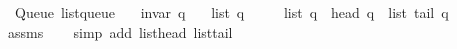 \begin{isabellebody}
%
\endisadeliminvisible
%
\isataginvisible
{}\isamarkupfalse%
\ {\isacharparenleft}{\kern0pt}\ Queue{\isacharparenright}{\kern0pt}\ list{\isacharunderscore}{\kern0pt}queue{\isacharcolon}{\kern0pt}\isanewline
\ \ \ {\isachardoublequoteopen}invar\ q{\isachardoublequoteclose}\isanewline
\ \ \ {\isachardoublequoteopen}list\ q\ {\isasymnoteq}\ {\isacharbrackleft}{\kern0pt}{\isacharbrackright}{\kern0pt}{\isachardoublequoteclose}\isanewline
\ \ \ {\isachardoublequoteopen}list\ q\ {\isacharequal}{\kern0pt}\ head\ q\ {\isacharhash}{\kern0pt}\ list\ {\isacharparenleft}{\kern0pt}tail\ q{\isacharparenright}{\kern0pt}{\isachardoublequoteclose}%
\endisataginvisible
{\isafoldinvisible}%
%
\isadeliminvisible
\isanewline
%
\endisadeliminvisible
%
\isadelimproof
\ \ %
\endisadelimproof
%
\isatagproof
{}\isamarkupfalse%
\ assms\isanewline
\ \ \isamarkupfalse%
\ {\isacharparenleft}{\kern0pt}simp\ add{\isacharcolon}{\kern0pt}\ list{\isacharunderscore}{\kern0pt}head\ list{\isacharunderscore}{\kern0pt}tail{\isacharparenright}{\kern0pt}%
\endisatagproof
{\isafoldproof}%
%
\isadelimproof
\isanewline
%
\endisadelimproof
%
\isadelimtheory
\isanewline
%
\endisadelimtheory
%
\isatagtheory
{}\isamarkupfalse%
%
\endisatagtheory
{\isafoldtheory}%
%
\isadelimtheory
%
\endisadelimtheory
%
\end{isabellebody}%
\endinput
